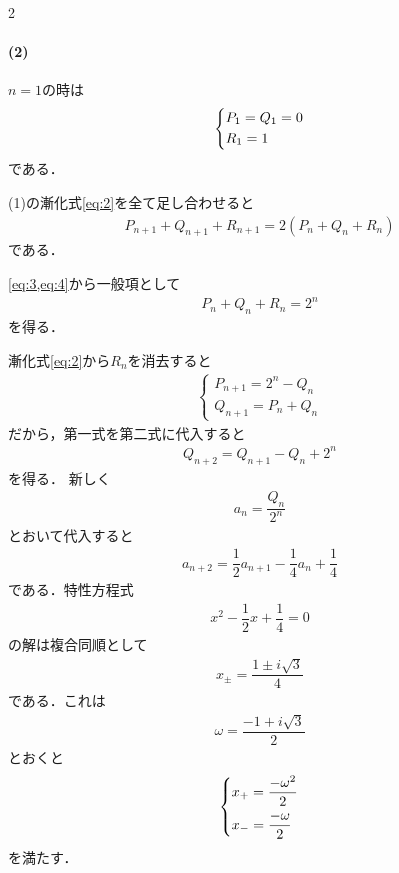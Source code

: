 \documentclass[../../main.tex]{subfiles}
\begin{document}
\begin{multicols}{2}
  \paragraph{(2)}
  $n=1$の時は
  \begin{align}
    \begin{dcases}
      P_1 = Q_1 = 0 \\
      R_1 = 1
    \end{dcases} \label{eq:3}
  \end{align}
  である．

  (1)の漸化式\cref{eq:2}を全て足し合わせると
  \begin{align}
    P_{n+1}+Q_{n+1}+R_{n+1} = 2\left(P_n + Q_n + R_n\right)  \label{eq:4}
  \end{align}
  である．

  \cref{eq:3,eq:4}から一般項として
  \begin{align}
    P_n + Q_n + R_n = 2^{n} \label{eq:5}
  \end{align}
  を得る．

  漸化式\cref{eq:2}から$R_n$を消去すると
  \begin{align}
    \begin{cases}
      P_{n+1} = 2^n - Q_n \\
      Q_{n+1} = P_n + Q_n
    \end{cases} \label{eq:6}
  \end{align}
  だから，第一式を第二式に代入すると
  \begin{align}
    Q_{n+2} = Q_{n+1} - Q_n + 2^n
  \end{align}
  を得る．
  新しく
  \begin{align}
    a_n = \dfrac{Q_n}{2^n} \label{eq:7}
  \end{align}
  とおいて代入すると
  \begin{align}
    a_{n+2} = \dfrac{1}{2}a_{n+1} - \dfrac{1}{4}a_n + \dfrac{1}{4} \label{eq:8}
  \end{align}
  である．特性方程式
  \begin{align}
    x^2-\dfrac{1}{2}x+\dfrac{1}{4} = 0
  \end{align}
  の解は複合同順として
  \begin{align}
    x_{\pm} = \dfrac{1\pm i\sqrt{3}}{4}
  \end{align}
  である．これは
  \begin{align}
    \omega = \dfrac{-1+i\sqrt{3}}{2} \label{eq:9}
  \end{align}
  とおくと
  \begin{align}
    \begin{dcases}
      x_{+} = \dfrac{-\omega^2}{2} \\
      x_{-} = \dfrac{-\omega}{2}
    \end{dcases} \label{eq:10}
  \end{align}
  を満たす．


\end{multicols}
\end{document}
